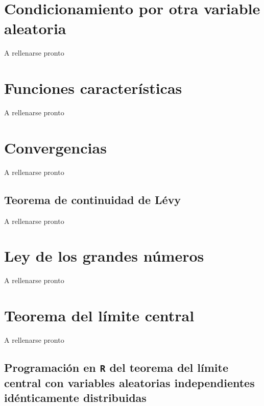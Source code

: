 \documentclass[
]{book}
\begin{document}
\hypertarget{condicionamiento-por-otra-variable-aleatoria}{%
\section{Condicionamiento por otra variable aleatoria}\label{condicionamiento-por-otra-variable-aleatoria}}

A rellenarse pronto

\hypertarget{funciones-caracteruxedsticas}{%
\section{Funciones características}\label{funciones-caracteruxedsticas}}

A rellenarse pronto

\hypertarget{convergencias}{%
\section{Convergencias}\label{convergencias}}

A rellenarse pronto

\hypertarget{teorema-de-continuidad-de-luxe9vy}{%
\subsection{Teorema de continuidad de Lévy}\label{teorema-de-continuidad-de-luxe9vy}}

A rellenarse pronto

\hypertarget{ley-de-los-grandes-nuxfameros}{%
\section{Ley de los grandes números}\label{ley-de-los-grandes-nuxfameros}}

A rellenarse pronto

\hypertarget{teorema-del-luxedmite-central}{%
\section{Teorema del límite central}\label{teorema-del-luxedmite-central}}

A rellenarse pronto

\hypertarget{programaciuxf3n-en-r-del-teorema-del-luxedmite-central-con-variables-aleatorias-independientes-iduxe9nticamente-distribuidas}{%
\subsection{\texorpdfstring{Programación en \texttt{R} del teorema del límite central con variables aleatorias independientes idénticamente distribuidas}{Programación en R del teorema del límite central con variables aleatorias independientes idénticamente distribuidas}}\label{programaciuxf3n-en-r-del-teorema-del-luxedmite-central-con-variables-aleatorias-independientes-iduxe9nticamente-distribuidas}}
\end{document}
